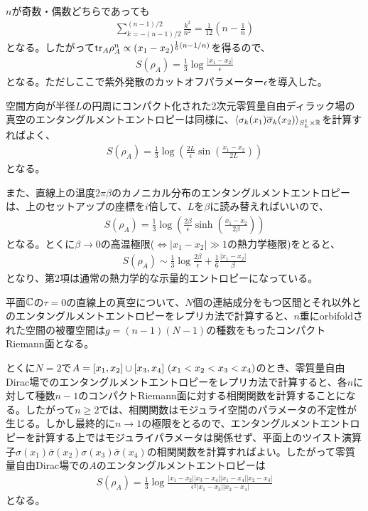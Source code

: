 $n$が奇数・偶数どちらであっても
\begin{align}
\sum_{k=-(n-1)/2}^{(n-1)/2} \frac{k^2}{n^2} =\frac{1}{12}\left(n-\frac{1}{n}\right)
\end{align}
となる。したがって$\textnormal{tr}_A \rho_A^n \propto (x_1-x_2)^{\frac{1}{6}(n-1/n)}$を得るので、
\begin{align}\label{freediracEEplane}
S(\rho_{A})=\frac{1}{3}\log \frac{|x_1-x_2|}{\epsilon}
\end{align}
となる。ただしここで紫外発散のカットオフパラメーター$\epsilon$を導入した。

空間方向が半径$L$の円周にコンパクト化された2次元零質量自由ディラック場の真空のエンタングルメントエントロピーは同様に、$\langle \sigma_k(x_1)\overline{\sigma}_k(x_2)\rangle_{S_L^1\times \mathbb{R}}$を計算すればよく、
\begin{align}
S(\rho_{A})=\frac{1}{3}\log \left(\frac{2L}{\epsilon}\sin\left(\frac{x_1-x_2}{2L}\right)\right)
\end{align}
となる。

また、直線上の温度$2\pi\beta$のカノニカル分布のエンタングルメントエントロピーは、上のセットアップの座標を$i$倍して、$L$を$\beta$に読み替えればいいので、
\begin{align}
S(\rho_{A})=\frac{1}{3}\log \left(\frac{2\beta}{\epsilon}\sinh\left(\frac{x_1-x_2}{2\beta}\right)\right)
\end{align}
となる。とくに$\beta\to 0$の高温極限($\iff |x_1-x_2|\gg 1$の熱力学極限)をとると、
\begin{align}
S(\rho_{A})\sim\frac{1}{3}\log\frac{2\beta}{\epsilon}+\frac{1}{6}\frac{|x_1-x_2|}{\beta}
\end{align}
となり、第$2$項は通常の熱力学的な示量的エントロピーになっている。

平面$\mathbb{C}$の$\tau=0$の直線上の真空について、$N$個の連結成分をもつ区間とそれ以外とのエンタングルメントエントロピーをレプリカ法で計算すると、$n$重にorbifoldされた空間の被覆空間は$g=(n-1)(N-1)$の種数をもったコンパクトRiemann面となる。

とくに$N=2$で$A=[x_1,x_2]\union [x_3,x_4]\ (x_1<x_2<x_3<x_4)$のとき、零質量自由Dirac場でのエンタングルメントエントロピーをレプリカ法で計算すると、各$n$に対して種数$n-1$のコンパクトRiemann面に対する相関関数を計算することになる。したがって$n\geq 2$では、相関関数はモジュライ空間のパラメータの不定性が生じる。しかし最終的に$n\to 1$の極限をとるので、エンタングルメントエントロピーを計算する上ではモジュライパラメータは関係せず、平面上のツイスト演算子$\sigma(x_1)\overline{\sigma}(x_2)\sigma(x_3)\overline{\sigma}(x_4)$の相関関数を計算すればよい。したがって零質量自由Dirac場での$A$のエンタングルメントエントロピーは
\begin{align}
S(\rho_A)=\frac{1}{3}\log\frac{|x_1-x_2||x_3-x_4||x_1-x_4||x_2-x_3|}{\epsilon^2|x_1-x_3||x_2-x_4|}
\end{align}
となる。

